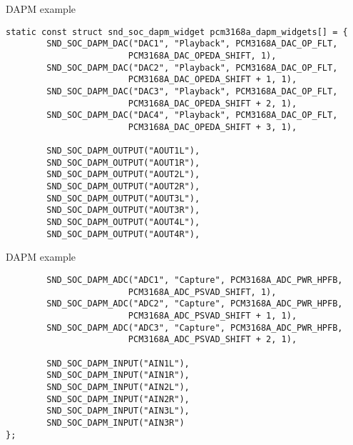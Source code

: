 \begin{frame}[fragile]{DAPM example}
  \begin{block}{}
    \fontsize{8}{7}\selectfont
    \begin{verbatim}
static const struct snd_soc_dapm_widget pcm3168a_dapm_widgets[] = {
        SND_SOC_DAPM_DAC("DAC1", "Playback", PCM3168A_DAC_OP_FLT,
                        PCM3168A_DAC_OPEDA_SHIFT, 1),
        SND_SOC_DAPM_DAC("DAC2", "Playback", PCM3168A_DAC_OP_FLT,
                        PCM3168A_DAC_OPEDA_SHIFT + 1, 1),
        SND_SOC_DAPM_DAC("DAC3", "Playback", PCM3168A_DAC_OP_FLT,
                        PCM3168A_DAC_OPEDA_SHIFT + 2, 1),
        SND_SOC_DAPM_DAC("DAC4", "Playback", PCM3168A_DAC_OP_FLT,
                        PCM3168A_DAC_OPEDA_SHIFT + 3, 1),

        SND_SOC_DAPM_OUTPUT("AOUT1L"),
        SND_SOC_DAPM_OUTPUT("AOUT1R"),
        SND_SOC_DAPM_OUTPUT("AOUT2L"),
        SND_SOC_DAPM_OUTPUT("AOUT2R"),
        SND_SOC_DAPM_OUTPUT("AOUT3L"),
        SND_SOC_DAPM_OUTPUT("AOUT3R"),
        SND_SOC_DAPM_OUTPUT("AOUT4L"),
        SND_SOC_DAPM_OUTPUT("AOUT4R"),
    \end{verbatim}
  \end{block}
\end{frame}

\begin{frame}[fragile]{DAPM example}
  \begin{block}{}
    \fontsize{8}{7}\selectfont
    \begin{verbatim}
        SND_SOC_DAPM_ADC("ADC1", "Capture", PCM3168A_ADC_PWR_HPFB,
                        PCM3168A_ADC_PSVAD_SHIFT, 1),
        SND_SOC_DAPM_ADC("ADC2", "Capture", PCM3168A_ADC_PWR_HPFB,
                        PCM3168A_ADC_PSVAD_SHIFT + 1, 1),
        SND_SOC_DAPM_ADC("ADC3", "Capture", PCM3168A_ADC_PWR_HPFB,
                        PCM3168A_ADC_PSVAD_SHIFT + 2, 1),

        SND_SOC_DAPM_INPUT("AIN1L"),
        SND_SOC_DAPM_INPUT("AIN1R"),
        SND_SOC_DAPM_INPUT("AIN2L"),
        SND_SOC_DAPM_INPUT("AIN2R"),
        SND_SOC_DAPM_INPUT("AIN3L"),
        SND_SOC_DAPM_INPUT("AIN3R")
};
    \end{verbatim}
  \end{block}
\end{frame}


